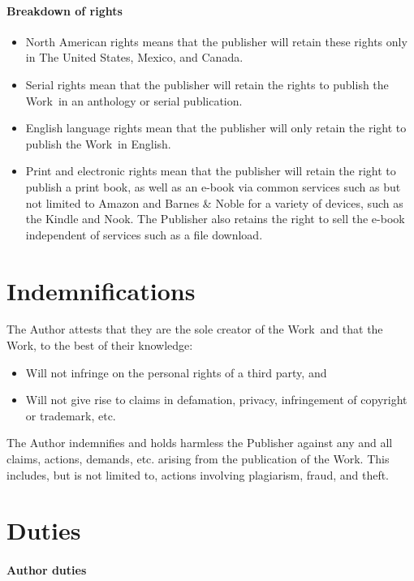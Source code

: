 \documentclass[12pt,letterpaper,oneside]{article}
\def\TheWork{the Work} %
\begin{document}
\paragraph{Breakdown of rights}

\begin{itemize}
    \item North American rights means that the publisher will retain these rights only in The United States, Mexico, and Canada.
    \item Serial rights mean that the publisher will retain the rights to publish \TheWork\ in an anthology or serial publication.
    \item English language rights mean that the publisher will only retain the right to publish \TheWork\ in English.
    \item Print and electronic rights mean that the publisher will retain the right to publish a print book, as well as an e-book via common services such as but not limited to Amazon and Barnes \& Noble for a variety of devices, such as the Kindle and Nook. The Publisher also retains the right to sell the e-book independent of services such as a file download.
\end{itemize}

\section{Indemnifications}

The Author attests that they are the sole creator of \TheWork\ and that \TheWork, to the best of their knowledge:

\begin{itemize}
    \item Will not infringe on the personal rights of a third party, and
    \item Will not give rise to claims in defamation, privacy, infringement of copyright or trademark, etc.
\end{itemize}

The Author indemnifies and holds harmless the Publisher against any and all claims, actions, demands, etc. arising from the publication of \TheWork. This includes, but is not limited to, actions involving plagiarism, fraud, and theft.

\section{Duties}

\paragraph{Author duties}
\end{document}
